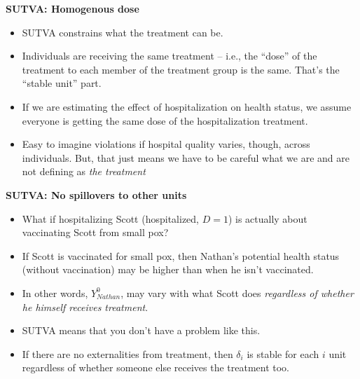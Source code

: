 \documentclass[notes=show]{beamer}
\begin{document}
\begin{frame}[plain]
	\begin{center}
	\textbf{SUTVA: Homogenous dose}
	\end{center}
	
	\begin{itemize}
		\item SUTVA constrains what the treatment can be.  
		\item Individuals are receiving the same treatment -- i.e., the ``dose'' of the treatment to each member of the treatment group is the same.  That's the ``stable unit'' part.  
		\item If we are estimating the effect of hospitalization on health status, we assume everyone is getting the same dose of the hospitalization treatment.  
		\item Easy to imagine violations if hospital quality varies, though, across individuals.  But, that just means we have to be careful what we are and are not defining as \emph{the treatment}
	\end{itemize}
\end{frame}

\begin{frame}[plain]
	\begin{center}
	\textbf{SUTVA: No spillovers to other units}
	\end{center}
	
	\begin{itemize}
	\item What if hospitalizing Scott (hospitalized, $D=1$) is actually about vaccinating Scott from small pox?  
	\item If Scott is vaccinated for small pox, then Nathan's potential health status (without vaccination) may be higher than when he isn't vaccinated.  
	\item In other words, $Y^0_{Nathan}$, may vary with what Scott does \emph{regardless of whether he himself receives treatment}. 
	\item SUTVA means that you don't have a problem like this.
	\item If there are no externalities from treatment, then $\delta_i$ is stable for each $i$ unit regardless of whether someone else receives the treatment too.
	\end{itemize}
\end{frame}
\end{document}
